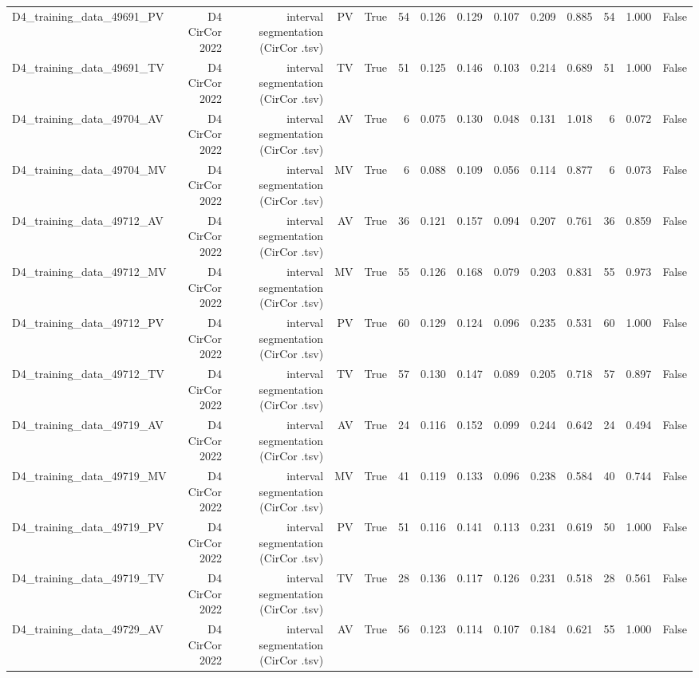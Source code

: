 \begin{table}[htbp]
\begin{tabular}{lrrrrrrrrrrrrr}
    D4\_training\_data\_49691\_PV & D4 CirCor 2022 & interval segmentation (CirCor .tsv) & PV & True & 54 & 0.126 & 0.129 & 0.107 & 0.209 & 0.885 & 54 & 1.000 & False \\
    D4\_training\_data\_49691\_TV & D4 CirCor 2022 & interval segmentation (CirCor .tsv) & TV & True & 51 & 0.125 & 0.146 & 0.103 & 0.214 & 0.689 & 51 & 1.000 & False \\
    D4\_training\_data\_49704\_AV & D4 CirCor 2022 & interval segmentation (CirCor .tsv) & AV & True & 6 & 0.075 & 0.130 & 0.048 & 0.131 & 1.018 & 6 & 0.072 & False \\
    D4\_training\_data\_49704\_MV & D4 CirCor 2022 & interval segmentation (CirCor .tsv) & MV & True & 6 & 0.088 & 0.109 & 0.056 & 0.114 & 0.877 & 6 & 0.073 & False \\
    D4\_training\_data\_49712\_AV & D4 CirCor 2022 & interval segmentation (CirCor .tsv) & AV & True & 36 & 0.121 & 0.157 & 0.094 & 0.207 & 0.761 & 36 & 0.859 & False \\
    D4\_training\_data\_49712\_MV & D4 CirCor 2022 & interval segmentation (CirCor .tsv) & MV & True & 55 & 0.126 & 0.168 & 0.079 & 0.203 & 0.831 & 55 & 0.973 & False \\
    D4\_training\_data\_49712\_PV & D4 CirCor 2022 & interval segmentation (CirCor .tsv) & PV & True & 60 & 0.129 & 0.124 & 0.096 & 0.235 & 0.531 & 60 & 1.000 & False \\
    D4\_training\_data\_49712\_TV & D4 CirCor 2022 & interval segmentation (CirCor .tsv) & TV & True & 57 & 0.130 & 0.147 & 0.089 & 0.205 & 0.718 & 57 & 0.897 & False \\
    D4\_training\_data\_49719\_AV & D4 CirCor 2022 & interval segmentation (CirCor .tsv) & AV & True & 24 & 0.116 & 0.152 & 0.099 & 0.244 & 0.642 & 24 & 0.494 & False \\
    D4\_training\_data\_49719\_MV & D4 CirCor 2022 & interval segmentation (CirCor .tsv) & MV & True & 41 & 0.119 & 0.133 & 0.096 & 0.238 & 0.584 & 40 & 0.744 & False \\
    D4\_training\_data\_49719\_PV & D4 CirCor 2022 & interval segmentation (CirCor .tsv) & PV & True & 51 & 0.116 & 0.141 & 0.113 & 0.231 & 0.619 & 50 & 1.000 & False \\
    D4\_training\_data\_49719\_TV & D4 CirCor 2022 & interval segmentation (CirCor .tsv) & TV & True & 28 & 0.136 & 0.117 & 0.126 & 0.231 & 0.518 & 28 & 0.561 & False \\
    D4\_training\_data\_49729\_AV & D4 CirCor 2022 & interval segmentation (CirCor .tsv) & AV & True & 56 & 0.123 & 0.114 & 0.107 & 0.184 & 0.621 & 55 & 1.000 & False \\

\end{tabular}
\end{table}
